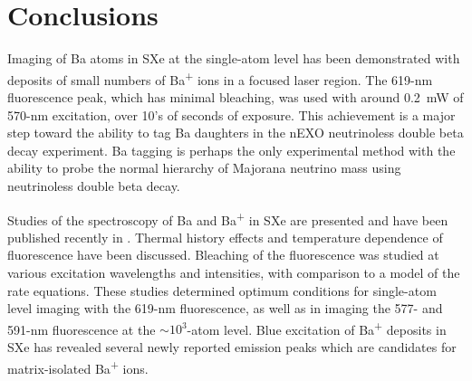 \chapter{Conclusions}

Imaging of Ba atoms in SXe at the single-atom level has been demonstrated with deposits of small numbers of Ba\textsuperscript{+} ions in a focused laser region.  The 619-nm fluorescence peak, which has minimal bleaching, was used with around 0.2~mW of 570-nm excitation, over 10's of seconds of exposure.  This achievement is a major step toward the ability to tag Ba daughters in the nEXO neutrinoless double beta decay experiment.  Ba tagging is perhaps the only experimental method with the ability to probe the normal hierarchy of Majorana neutrino mass using neutrinoless double beta decay.

Studies of the spectroscopy of Ba and Ba\textsuperscript{+} in SXe are presented and have been published recently in \cite{Mong2015}.  Thermal history effects and temperature dependence of fluorescence have been discussed.  Bleaching of the fluorescence was studied at various excitation wavelengths and intensities, with comparison to a model of the rate equations.  These studies determined optimum conditions for single-atom level imaging with the 619-nm fluorescence, as well as in imaging the 577- and 591-nm fluorescence at the $\sim 10^{3}$-atom level.  Blue excitation of Ba\textsuperscript{+} deposits in SXe has revealed several newly reported emission peaks which are candidates for matrix-isolated Ba\textsuperscript{+} ions.



